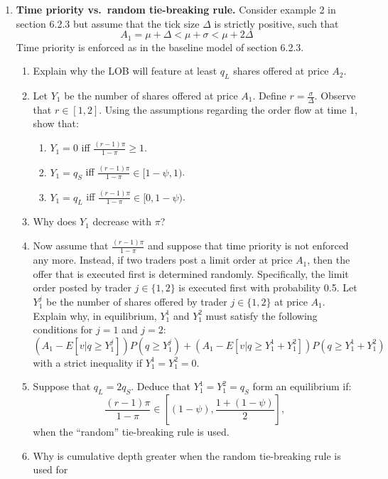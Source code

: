 \documentclass[a4paper]{article}
\newcommand{\ansline}{\begin{center}\rule{8cm}{0.4pt}\end{center}}
\begin{document}
\begin{enumerate}
\begin{enumerate}
      \item 
    \end{enumerate}
    \ansline
  \item \textbf{Time priority vs.\ random tie-breaking rule.} Consider example 2 in section 6.2.3 but 
    assume that the tick size $\Delta$ is strictly positive, such that
    \[A_1 = \mu + \Delta < \mu + \sigma < \mu + 2\Delta\]
    Time priority is enforced as in the baseline model of section 6.2.3.
    \begin{enumerate}
      \item Explain why the LOB will feature at least $q_L$ shares offered at price $A_2$.
      \item Let $Y_1$ be the number of shares offered at price $A_1$. Define $r = \frac{\sigma}{\Delta}$. 
        Observe that $r \in [1,2]$. Using the assumptions regarding the order flow at time 1, show that:
        \begin{enumerate}
          \item $Y_1 = 0$ iff $\frac{(r-1)\pi}{1-\pi} \geq 1$.
          \item $Y_1 = q_S$ iff $\frac{(r-1)\pi}{1-\pi} \in [1-\psi, 1)$.
          \item $Y_1 = q_L$ iff $\frac{(r-1)\pi}{1-\pi} \in [0,  1-\psi)$.
        \end{enumerate}
      \item Why does $Y_1$ decrease with $\pi$?
      \item Now assume that $\frac{(r-1)\pi}{1-\pi}$ and suppose that time priority is not enforced any more. 
        Instead, if two traders post a limit order at price $A_1$, then the offer that is executed first is determined 
        randomly. Specifically, the limit order posted by trader $j\in \{1, 2\}$ is executed first with probability 0.5. Let $Y_1^j$ be the 
        number of shares offered by trader $j \in \{1, 2\}$ at price $A_1$. Explain why, in equilibrium, $Y_1^1$ and $Y_1^2$ must satisfy the 
        following conditions for $j = 1$ and $j=2$:
        \[\left(A_1-E\left[v|q \geq Y_1^j\right]\right)P(q\geq Y_1^j) + (A_1 - E[v|q \geq Y_1^1 + Y_1^2])P(q \geq Y_1^1 + Y_1^2)\]
        with a strict inequality if $Y_1^1 = Y_1^2= 0$.
      \item Suppose that $q_L = 2q_S$. Deduce that $Y_1^1 = Y_1^2 = q_S$ form an equilibrium if:
        \[\frac{(r-1)\pi}{1-\pi} \in \left[(1-\psi), \frac{1 + (1-\psi)}{2}\right],\]
          when the ``random'' tie-breaking rule is used.
        \item Why is cumulative depth greater when the random tie-breaking rule is used for 

\end{enumerate}
\end{enumerate}
\end{document}
